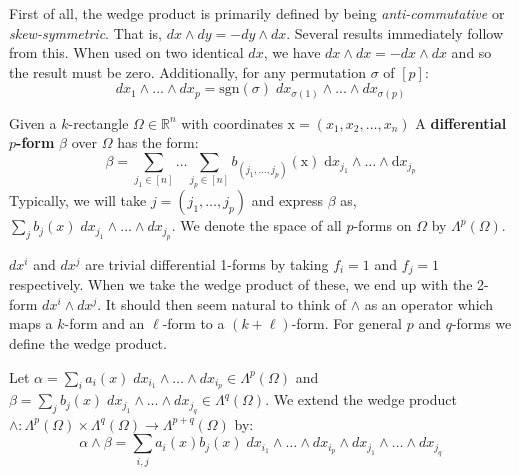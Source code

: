 First of all, the wedge product is primarily defined by being \emph{anti-commutative} or \emph{skew-symmetric}.
That is, $dx \wedge dy = -dy \wedge dx$.
Several results immediately follow from this.
When used on two identical $dx$, we have $dx \wedge dx = - dx \wedge dx$ and so the result must be zero.
Additionally, for any permutation $\sigma$ of $[p]$:
\begin{equation}
	dx_1 \wedge ... \wedge dx_p = \text{sgn}(\sigma) \; dx_{\sigma(1)} \wedge ... \wedge dx_{\sigma(p)}
\end{equation}


\begin{definition}
	Given a $k$-rectangle $\Omega \in \mathbb{R}^n$ with coordinates $\text{x} = (x_1, x_2, \ldots, x_n)$
	A \textbf{differential $p$-form} $\beta$ over $\Omega$ has the form:
	\begin{equation}
		\beta = \sum_{j_1 \in [n]} \ldots \sum_{j_p \in [n]} b_{(j_1, \ldots, j_p)}(\text{x}) \; 
				\text{d} x_{j_1} \wedge \ldots \wedge \text{d} x_{j_p}
	\end{equation}
	Typically, we will take $j = (j_1, \ldots, j_p)$ and express $\beta$ as, 
	$\sum_j b_j(x) \; dx_{j_1} \wedge \ldots \wedge dx_{j_p}$.
	We denote the space of all $p$-forms on $\Omega$ by $\Lambda^p(\Omega)$.
\end{definition}


$dx^i$ and $dx^j$ are trivial differential 1-forms by taking $f_i=1$ and $f_j=1$ respectively.
When we take the wedge product of these, we end up with the 2-form $dx^i \wedge dx^j$.
It should then seem natural to think of $\wedge$ as an operator which maps 
a $k$-form and an $\ell$-form to a $(k+\ell)$-form.
For general $p$ and $q$-forms we define the wedge product.

\begin{definition}
	Let $\alpha = \sum_i a_i(x) \; dx_{i_1} \wedge \ldots \wedge dx_{i_p} \in \Lambda^p(\Omega)$ and 
	$\beta = \sum_j b_j(x) \; dx_{j_1} \wedge \ldots \wedge dx_{j_q} \in \Lambda^q(\Omega)$. We extend the
	wedge product $\wedge : \Lambda^p(\Omega) \times \Lambda^q(\Omega) \to \Lambda^{p+q}(\Omega)$ by:
	\begin{equation}
		\alpha \wedge \beta  = \sum_{i,j} a_i(x) b_j(x) \; 
			dx_{i_1} \wedge \ldots \wedge dx_{i_p} \wedge 
			dx_{j_1} \wedge \ldots \wedge dx_{j_q}
	\end{equation}
\end{definition}


